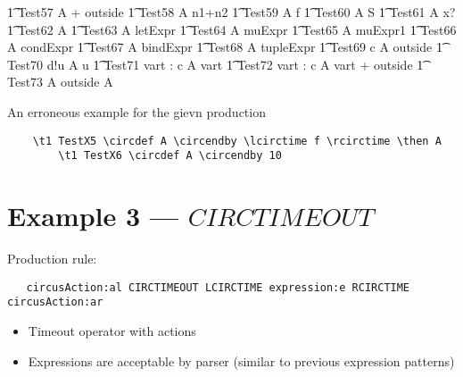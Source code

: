 \documentclass{article}
\begin{document}
\begin{circusaction}
   \t1 Test57 \circdef A \circendby {} + outside \rcirctime 
   \also
   \t1 Test58 \circdef A \circendby \lcirctime n1+n2 \rcirctime 
   \also
   \t1 Test59 \circdef A \circendby \lcirctime f \rcirctime 
   \also
   \t1 Test60 \circdef A \circendby \lcirctime \theta S \rcirctime 
   \also
   \t1 Test61 \circdef A \circendby \lcirctime x? \rcirctime 
   \also
   \t1 Test62 \circdef A \circendby {}  \rcirctime 
   \also
   \t1 Test63 \circdef A \circendby \lcirctime letExpr \rcirctime 
   \also
   \t1 Test64 \circdef A \circendby \lcirctime muExpr \rcirctime 
   \also
   \t1 Test65 \circdef A \circendby \lcirctime muExpr1 \rcirctime 
   \also
   \t1 Test66 \circdef A \circendby \lcirctime condExpr \rcirctime 
   \also
   \t1 Test67 \circdef A \circendby \lcirctime bindExpr \rcirctime 
   \also
   \t1 Test68 \circdef A \circendby \lcirctime tupleExpr \rcirctime 
   \also
   \t1 Test69 \circdef c \then A \circendby \lcirctime outside \rcirctime 
   \also
   \t1 Test70 \circdef d!u \then A \circendby \lcirctime u \rcirctime 
   \also
   \t1 Test71 \circdef \circvres vart : \nat \circspot  c \then A \circendby \lcirctime vart 
   \rcirctime 
   \also
   \t1 Test72 \circdef \circvres vart : \nat \circspot  c \then A \circendby \lcirctime vart + 
   outside \rcirctime 
   \also
   \t1 Test73 \circdef  A \circendby \lcirctime outside \rcirctime \circseq A 
\end{circusaction}

An erroneous example for the gievn production 
\begin{verbatim}
	\t1 TestX5 \circdef A \circendby \lcirctime f \rcirctime \then A
        \t1 TestX6 \circdef A \circendby 10
\end{verbatim}


\section{Example 3 --- $CIRCTIMEOUT$}


Production rule:
\begin{verbatim}
   circusAction:al CIRCTIMEOUT LCIRCTIME expression:e RCIRCTIME  circusAction:ar
\end{verbatim}

\begin{itemize}
	\item Timeout operator with actions
	\item Expressions are acceptable by parser (similar to previous expression patterns)
\end{itemize}
\end{document}
